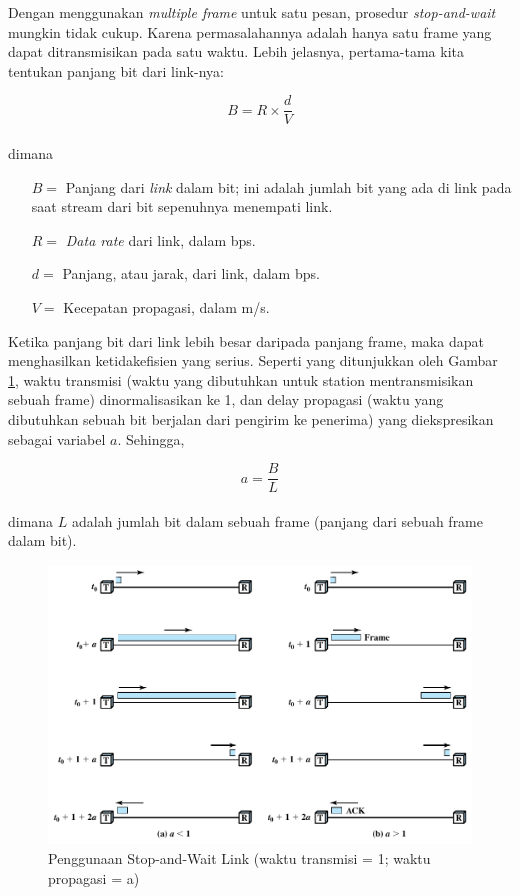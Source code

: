 Dengan menggunakan \textit{multiple frame} untuk satu pesan, prosedur \textit{stop-and-wait} mungkin tidak cukup. Karena permasalahannya adalah hanya satu frame yang dapat ditransmisikan pada satu waktu. Lebih jelasnya, pertama-tama kita tentukan panjang bit dari link-nya:

\begin{equation}\label{pers.07.01}
	B = R \times \frac{d}{V}
\end{equation}\\
dimana

\begin{itemize}
	\item[$ B = $] Panjang dari \textit{link} dalam bit; ini adalah jumlah bit yang ada di link pada saat stream dari bit sepenuhnya menempati link.
	\item[$ R = $] \textit{Data rate} dari link, dalam bps.
	\item[$ d = $] Panjang, atau jarak, dari link, dalam bps.
	\item[$ V = $] Kecepatan propagasi, dalam m/s.
\end{itemize}

Ketika panjang bit dari link lebih besar daripada panjang frame, maka dapat menghasilkan ketidakefisien yang serius. Seperti yang ditunjukkan oleh Gambar \ref{fig:07.02}, waktu transmisi (waktu yang dibutuhkan untuk station mentransmisikan sebuah frame) dinormalisasikan ke 1, dan delay propagasi (waktu yang dibutuhkan sebuah bit berjalan dari pengirim ke penerima) yang diekspresikan sebagai variabel $ a $. Sehingga,

\begin{equation}\label{pers.07.02}
	a = \frac{B}{L}
\end{equation} \\
dimana $ L $ adalah jumlah bit dalam sebuah frame (panjang dari sebuah frame dalam bit).

\begin{figure}
	\centering
	\includegraphics[width=\linewidth]{gambar/fig:07.02}
	\caption{Penggunaan Stop-and-Wait Link (waktu transmisi = 1; waktu propagasi = a)}
	\label{fig:07.02}
\end{figure}

